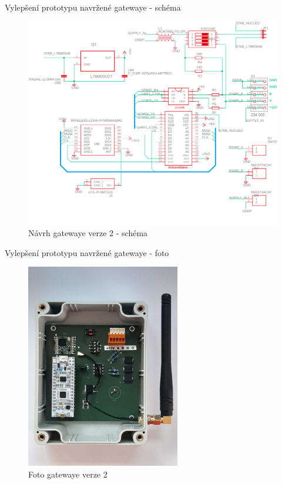 \documentclass{beamer}
\begin{document}
\begin{frame}{Vylepšení prototypu navržené gatewaye - schéma}
	\begin{figure}[!h]
		\centering
		\includegraphics[width=1\textwidth]{minigateway_schema}
		\caption{Návrh gatewaye verze 2 - schéma}
		\label{fig:minigateway_schema}
	\end{figure}
\end{frame}


\begin{frame}{Vylepšení prototypu navržené gatewaye - foto}
	\begin{figure}[!h]
		\centering
		\includegraphics[width=0.6\textwidth]{photo_minigatewayV2}
		\caption{Foto gatewaye verze 2}
		\label{fig:minigateway_fotoV2}
	\end{figure}
\end{frame}
\end{document}
